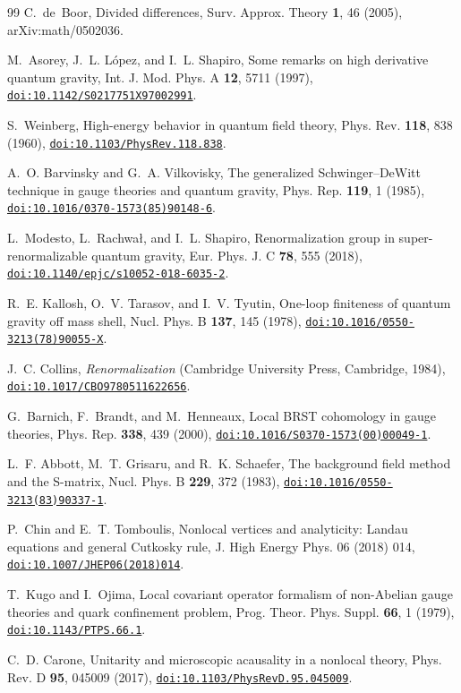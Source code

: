 \documentclass[aps,prd,10pt,twocolumn,superscriptaddress,nofootinbib,floatfix,longbibliography]{revtex4-2}
\newcommand{\doilink}[1]{\href{https://doi.org/#1}{\nolinkurl{doi:#1}}}
\begin{document}
\begin{thebibliography}{99}
C.~de~Boor, Divided differences, Surv. Approx. Theory \textbf{1}, 46 (2005), arXiv:math/0502036.

M.~Asorey, J.~L. L\'opez, and I.~L. Shapiro, Some remarks on high derivative quantum gravity, Int. J. Mod. Phys. A \textbf{12}, 5711 (1997), \doilink{10.1142/S0217751X97002991}.

S.~Weinberg, High-energy behavior in quantum field theory, Phys. Rev. \textbf{118}, 838 (1960), \doilink{10.1103/PhysRev.118.838}.

A.~O. Barvinsky and G.~A. Vilkovisky, The generalized Schwinger--DeWitt technique in gauge theories and quantum gravity, Phys. Rep. \textbf{119}, 1 (1985), \doilink{10.1016/0370-1573(85)90148-6}.

L.~Modesto, L.~Rachwa{\l}, and I.~L. Shapiro, Renormalization group in super-renormalizable quantum gravity, Eur. Phys. J. C \textbf{78}, 555 (2018), \doilink{10.1140/epjc/s10052-018-6035-2}.

R.~E. Kallosh, O.~V. Tarasov, and I.~V. Tyutin, One-loop finiteness of quantum gravity off mass shell, Nucl. Phys. B \textbf{137}, 145 (1978), \doilink{10.1016/0550-3213(78)90055-X}.

J.~C. Collins, \emph{Renormalization} (Cambridge University Press, Cambridge, 1984), \doilink{10.1017/CBO9780511622656}.

G.~Barnich, F.~Brandt, and M.~Henneaux, Local BRST cohomology in gauge theories, Phys. Rep. \textbf{338}, 439 (2000), \doilink{10.1016/S0370-1573(00)00049-1}.

L.~F. Abbott, M.~T. Grisaru, and R.~K. Schaefer, The background field method and the S-matrix, Nucl. Phys. B \textbf{229}, 372 (1983), \doilink{10.1016/0550-3213(83)90337-1}.

P.~Chin and E.~T. Tomboulis, Nonlocal vertices and analyticity: Landau equations and general Cutkosky rule, J. High Energy Phys. 06 (2018) 014, \doilink{10.1007/JHEP06(2018)014}.

T.~Kugo and I.~Ojima, Local covariant operator formalism of non-Abelian gauge theories and quark confinement problem, Prog. Theor. Phys. Suppl. \textbf{66}, 1 (1979), \doilink{10.1143/PTPS.66.1}.

C.~D. Carone, Unitarity and microscopic acausality in a nonlocal theory, Phys. Rev. D \textbf{95}, 045009 (2017), \doilink{10.1103/PhysRevD.95.045009}.


\end{thebibliography}
\end{document}
